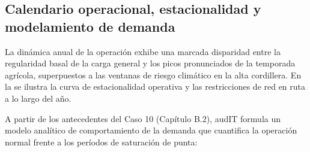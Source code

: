 \subsection{Calendario operacional, estacionalidad y modelamiento de demanda}\label{sec:2-estacionalidad}

La dinámica anual de la operación exhibe una marcada disparidad entre la regularidad basal de la carga general y los picos pronunciados de la temporada agrícola, superpuestos a las ventanas de riesgo climático en la alta cordillera. En la  se ilustra la curva de estacionalidad operativa y las restricciones de red en ruta a lo largo del año.


A partir de los antecedentes del Caso 10 (Capítulo B.2), audIT formula un modelo analítico de comportamiento de la demanda que cuantifica la operación normal frente a los períodos de saturación de punta:

